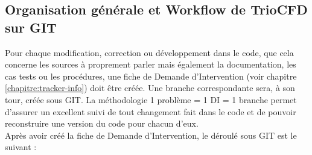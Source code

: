 \subsection{\label{subsec:WorkflowGIT}Organisation générale et Workflow de TrioCFD sur GIT}
Pour chaque modification, correction ou développement dans le code, que cela concerne les sources à proprement parler mais également la documentation, les cas tests ou les procédures,  une fiche de Demande d'Intervention (voir chapitre \ref{chapitre:tracker-info}) doit être créée. Une branche correspondante sera, à son tour, créée sous GIT. La méthodologie 1 problème = 1 DI = 1 branche permet d'assurer un excellent suivi de tout changement fait dans le code et de pouvoir reconstruire une version du code pour chacun d'eux.\\
Après avoir créé la fiche de Demande d'Intervention, le déroulé sous GIT est le suivant :
